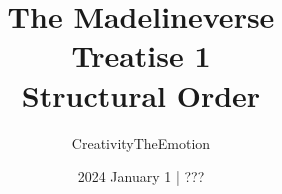 \documentclass[b5paper]{book}
\begin{document}
\frontmatter
\pagestyle{empty}
\title{The Madelineverse\\Treatise 1\\Structural Order}
\author{CreativityTheEmotion}
\date{2024 January 1 | ???}
\maketitle
\mainmatter
\pagestyle{myheadings}
\end{document}
